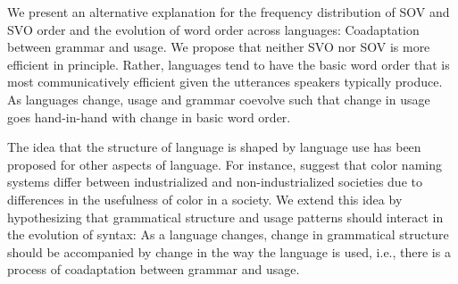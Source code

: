 \documentclass[11pt,a4paper]{article}
\newcommand\comment[1]{{\color{red}#1}}
\begin{document}
We present an alternative explanation for the frequency distribution of SOV and SVO order and the evolution of word order across languages:
Coadaptation between grammar and usage.
We propose that neither SVO nor SOV is more efficient in principle.
Rather, languages tend to have the basic word order that is most communicatively efficient given the utterances speakers typically produce.
As languages change, usage and grammar coevolve such that change in usage goes hand-in-hand with change in basic word order.

The idea that the structure of language is shaped by language use has been proposed for other aspects of language.
For instance, \cite{gibson2017color} suggest that color naming systems differ between industrialized and non-industrialized societies due to differences in the usefulness of color in a society. We extend this idea by hypothesizing that grammatical structure and usage patterns should interact in the evolution of syntax: As a language changes, change in grammatical structure should be accompanied by change in the way the language is used, i.e., there is a process of coadaptation between grammar and usage.


\end{document}
